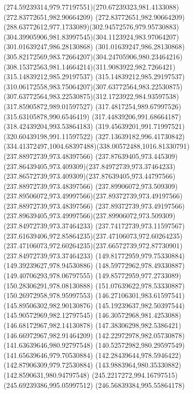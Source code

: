 {{		\curveto(274.59239314,979.77197551)(270.67239323,981.4133088)(272.83772651,982.90664209)
		\curveto(272.83772651,982.90664209)(288.63772612,977.1733089)(302.94572576,979.95730883)
		\curveto(304.39905906,981.83997545)(304.1123924,983.97064207)(301.01639247,986.28130868)
		\curveto(301.01639247,986.28130868)(305.82172569,983.72664207)(304.24705906,980.23464216)
		\curveto(308.15372563,981.14664214)(311.9083922,982.7266421)(315.14839212,985.29197537)
		\curveto(315.14839212,985.29197537)(310.06172558,983.75064207)(307.63772564,983.22530875)
		\curveto(307.63772564,983.22530875)(312.1723922,984.93597538)(317.85905872,989.01597527)
		\lineto(317.4817254,989.67997526)
		\lineto(315.63105878,990.6546419)
		\lineto(317.44839206,991.68664187)
		\lineto(318.42439204,993.53864183)
		\lineto(319.45639201,991.71997521)
		\lineto(320.60439198,991.11597522)
		\curveto(327.13639182,996.41730842)(334.41372497,1004.68397488)(338.00572488,1016.81330791)
		\moveto(237.88972739,973.48397566)
		\curveto(237.87639405,973.445309)(237.86439405,973.409309)(237.84972739,973.37464233)
		\curveto(237.86572739,973.409309)(237.87639405,973.44797566)(237.88972739,973.48397566)
		\moveto(237.89906072,973.509309)
		\curveto(237.89506072,973.49997566)(237.89372739,973.49197566)(237.88972739,973.48397566)
		\curveto(237.89372739,973.49197566)(237.89639405,973.49997566)(237.89906072,973.509309)
		\moveto(237.84972739,973.37464233)
		\curveto(237.74172739,973.11597567)(237.61639406,972.85864235)(237.47106073,972.60264235)
		\curveto(237.47106073,972.60264235)(237.66572739,972.87730901)(237.84972739,973.37464233)
		\moveto(149.81772959,979.75330884)
		\lineto(149.39239627,978.94530886)
		\lineto(148.59772962,978.49330887)
		\lineto(149.40706293,978.06797555)
		\lineto(149.85772959,977.2733089)
		\lineto(150.28306291,978.08130888)
		\lineto(151.07639622,978.53330887)
		\lineto(150.26972958,978.95997553)
		\closepath
		\moveto(146.27106301,983.61597541)
		\lineto(145.89506302,982.90130876)
		\lineto(145.19239637,982.50397544)
		\lineto(145.90572969,982.12797545)
		\lineto(146.30572968,981.4253088)
		\lineto(146.68172967,982.14130878)
		\lineto(147.38306298,982.5386421)
		\lineto(146.66972967,982.91464209)
		\closepath
		\moveto(142.22972978,982.05730878)
		\lineto(141.63639646,980.92797548)
		\lineto(140.52572982,980.29597549)
		\lineto(141.65639646,979.70530884)
		\lineto(142.28439644,978.5946422)
		\lineto(142.87906309,979.72530884)
		\lineto(143.9883964,980.35330882)
		\lineto(142.8590631,980.94797548)
		\closepath
		\moveto(245.2217272,994.16797515)
		\lineto(245.69239386,995.05997512)
		\lineto(246.56839384,995.55864178)
}}
